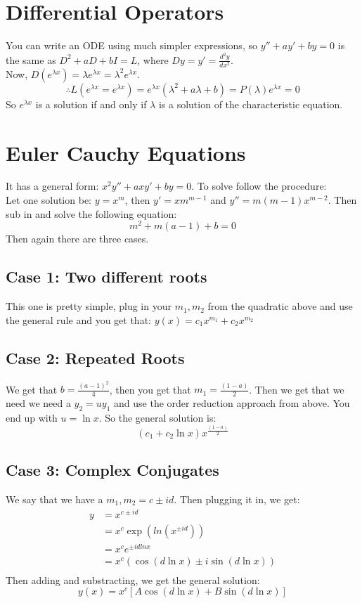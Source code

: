 \documentclass{article}
\newcommand{\dii}{\frac{d^2y}{dx^2}}
\renewcommand{\l}{\lambda}
\newcommand{\el}{e^{\l x}}
\begin{document}
\section{Differential Operators}
You can write an ODE using much simpler expressions, so $y'' + ay' + by = 0$ is the same as $D^2 + aD + bI = L$, where $\displaystyle{Dy = y' = \dii}$.\\

Now, $D(e^{\l x}) = \l e^{\l x} = \l ^2 e^{\l x}$.
$$ \therefore L(e^{\l x} = e^{\l x}) = e^{\l x}(\l ^2 + a\l + b) = P(\l)\el = 0 $$
So $\el$ is a solution if and only if $\l$ is a solution of the characteristic equation.

\section{Euler Cauchy Equations}
It has a general form: $\displaystyle{x^2y'' + axy' + by = 0}$. To solve follow the procedure:\\

Let one solution be: $\displaystyle{y = x^m}$, then $y' = xm^{m-1}$ and $y'' = m(m-1)x^{m-2}$. Then sub in and solve the following equation:
$$ m^2 + m(a-1) + b = 0 $$
Then again there are three cases.

\subsection{Case 1: Two different roots}

This one is pretty simple, plug in your $m_1, m_2$ from the quadratic above and use the general rule and you get that: $y(x) = c_1x^{m_1} + c_2x^{m_2}$

\subsection{Case 2: Repeated Roots}

We get that $b = \frac{(a-1)^2}{4}$, then you get that $m_1 = \frac{(1-a)}{2}$. Then we get that we need we need a $y_2  = uy_1$ and use the order reduction approach from above. You end up with $u = \ln x$. So the general solution is:
$$ (c_1 + c_2\ln x)x^{\frac{(1-a)}{2}} $$

\subsection{Case 3: Complex Conjugates}

We say that we have a $m_1,m_2 = c \pm id$. Then plugging it in, we get:
\begin{align*}
  y &= x^{c \pm id} \\
  &= x^c \exp(ln ( x^{\pm id})) \\
  &= x^c e^{\pm id ln x}\\
  &= x^c(\cos(d\ln x) \pm i\sin(d\ln x)) \\
\end{align*}
Then adding and substracting, we get the general solution:
$$ y(x) = x^c[ A\cos(d\ln x) + B\sin(d\ln x)] $$
\end{document}
